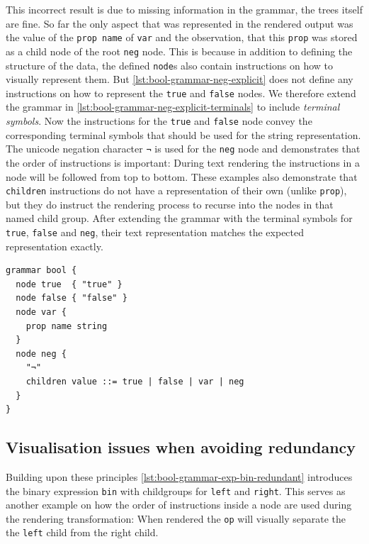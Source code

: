 \documentclass[]{report}
\begin{document}
This incorrect result is due to missing information in the grammar, the trees itself are fine. So far the only aspect that was represented in the rendered output was the value of the \texttt{prop name} of \texttt{var} and the observation, that this \texttt{prop} was stored as a child node of the root \texttt{neg} node. This is because in addition to defining the structure of the data, the defined \texttt{node}s also contain instructions on how to visually represent them. But \cref{lst:bool-grammar-neg-explicit} does not define any instructions on how to represent the \texttt{true} and \texttt{false} nodes.  We therefore extend the grammar in \cref{lst:bool-grammar-neg-explicit-terminals} to include \textit{terminal symbols}. Now the instructions for the \texttt{true} and \texttt{false} node convey the corresponding terminal symbols that should be used for the string representation. The unicode negation character \texttt{¬} is used for the \texttt{neg} node and demonstrates that the order of instructions is important: During text rendering the instructions in a node will be followed from top to bottom. These examples also demonstrate that \texttt{children} instructions do not have a representation of their own (unlike \texttt{prop}), but they do instruct the rendering process to recurse into the nodes in that named child group. After extending the grammar with the terminal symbols for \texttt{true}, \texttt{false} and \texttt{neg}, their text representation matches the expected representation exactly.

\begin{listing}[H]
\begin{verbatim}
grammar bool {
  node true  { "true" }
  node false { "false" }
  node var {
    prop name string
  }
  node neg {
    "¬"
    children value ::= true | false | var | neg
  }
}
\end{verbatim}
\caption{Boolean Expression Grammar: Negation with terminal symbols}
\label{lst:bool-grammar-neg-explicit-terminals}
\end{listing}

\subsection{Visualisation issues when avoiding redundancy}
\label{sec:bool-grammar-visualise-redundancy}

Building upon these principles \cref{lst:bool-grammar-exp-bin-redundant} introduces the binary expression \texttt{bin} with childgroups for \texttt{left} and \texttt{right}. This serves as another example on how the order of instructions inside a node are used during the rendering transformation: When rendered the \texttt{op} will visually separate the the \texttt{left} child from the \textrm{right} child.
\end{document}
